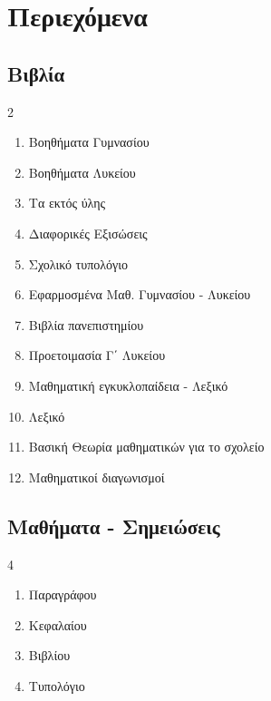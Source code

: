 \documentclass[11pt,a4paper]{book}
\begin{document}
\chapter{Περιεχόμενα}
\section{Βιβλία}
\begin{multicols}{2}
\begin{enumerate}[label=\arabic*]
\item Βοηθήματα Γυμνασίου
\item Βοηθήματα Λυκείου
\item Τα εκτός ύλης
\item Διαφορικές Εξισώσεις
\item Σχολικό τυπολόγιο
\item Εφαρμοσμένα Μαθ. Γυμνασίου - Λυκείου
\item Βιβλία πανεπιστημίου
\item Προετοιμασία Γ΄ Λυκείου
\item Μαθηματική εγκυκλοπαίδεια - Λεξικό
\item Λεξικό
\item Βασική Θεωρία μαθηματικών για το σχολείο
\item Μαθηματικοί διαγωνισμοί
\end{enumerate}
\end{multicols}
\section{Μαθήματα - Σημειώσεις}
\begin{multicols}{4}
\begin{enumerate}[label=\arabic*]
\item Παραγράφου
\item Κεφαλαίου
\item Βιβλίου
\item Τυπολόγιο
\end{enumerate}
\end{multicols}
\end{document}
